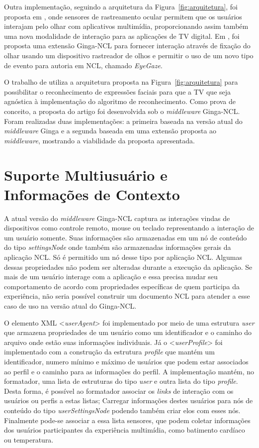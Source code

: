 Outra implementação, seguindo a arquitetura da Figura~\ref{fig:arquitetura}, foi proposta em \cite{montevecchi2020providing}, onde sensores de rastreamento ocular permitem que os usuários interajam pelo olhar com aplicativos multimídia, proporcionando assim também uma nova modalidade de interação para as aplicações de TV digital. Em \cite{montevecchi2020providing}, foi proposta uma extensão Ginga-NCL para fornecer interação através de fixação do olhar usando um dispositivo rastreador de olhos e permitir o uso de um novo tipo de evento para autoria  em NCL, chamado \textit{EyeGaze}.

O trabalho de  \cite{valentim2020possibilitando} utiliza a  arquitetura proposta na Figura~\ref{fig:arquitetura} para possibilitar o reconhecimento de expressões faciais para que a TV que seja agnóstica à implementação do algoritmo de reconhecimento. Como prova de conceito, a  proposta do artigo foi desenvolvida sob o \textit{middleware} Ginga-NCL. Foram realizadas duas implementações: a primeira baseada na versão atual do \textit{middleware} Ginga e a segunda baseada em uma extensão proposta ao \textit{middleware}, mostrando a viabilidade da proposta apresentada.

\section{Suporte Multiusuário e Informações de Contexto}

A atual versão do \textit{middleware} Ginga-NCL captura as interações vindas de dispositivos como controle remoto, mouse ou teclado representando a interação de um usuário somente. Suas informações são armazenadas em um nó de conteúdo do tipo \textit{settingsNode} onde também são armazenadas informações gerais da aplicação NCL. Só é permitido um nó desse tipo por aplicação NCL. Algumas dessas propriedades não podem ser alteradas durante a execução da aplicação. Se mais de um usuário interage com a aplicação e essa precisa mudar seu comportamento de acordo com propriedades específicas de quem participa da experiência, não seria possível construir um documento NCL para atender a esse caso de uso na versão atual do Ginga-NCL.

O elemento XML <\textit{userAgent}> foi implementado por meio de uma estrutura \textit{user} que armazena propriedades de um usuário como um identificador e o caminho do arquivo onde estão suas informações individuais. Já o <\textit{userProfile}> foi implementado com a construção da estrutura \textit{profile} que mantém um identificador, numero mínimo e máximo de usuários que podem estar associados ao perfil e o caminho para as informações do perfil. A implementação mantém, no formatador, uma lista de estruturas do tipo \textit{user} e outra lista do tipo \textit{profile}. Desta forma, é possível ao formatador associar os \textit{links} de interação com os usuários ou perfis a estas listas; Carregar informações destes usuários para nós de conteúdo do tipo \textit{userSettingsNode} podendo também criar elos com esses nós. Finalmente pode-se associar a essa lista sensores, que podem coletar informações dos usuários participantes da experiência multimídia, como batimento cardíaco ou temperatura.

